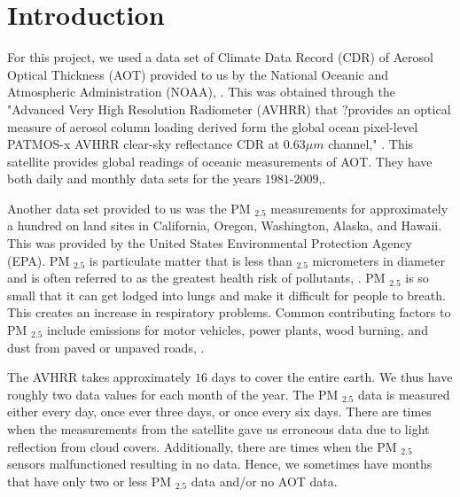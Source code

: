 \documentclass[10pt]{article}
\begin{document}
\section{Introduction}
	For this project, we used a data set of Climate Data Record (CDR) of Aerosol Optical Thickness (AOT) provided to us by the National Oceanic and Atmospheric Administration (NOAA), \cite{noaa}. This was obtained through the "Advanced Very High Resolution Radiometer (AVHRR) that ?provides an optical measure of aerosol column loading derived form the global ocean pixel-level PATMOS-x AVHRR clear-sky reflectance CDR at $0.63\mu m$ channel," \cite{noaa}. This satellite provides global readings of oceanic measurements of AOT. They have both daily and monthly data sets for the years $1981$-$2009$,\cite{noaa}. 

Another data set provided to us was the PM $_{2.5}$ measurements for approximately a hundred on land sites in California, Oregon, Washington, Alaska, and Hawaii. This was provided by the United States Environmental Protection Agency (EPA). PM $_{2.5}$ is particulate matter that is less than $_{2.5}$ micrometers in diameter and is often referred to as the greatest health risk of pollutants, \cite{epa}.  PM $_{2.5}$ is so small that it can get lodged into lungs and make it difficult for people to breath. This creates an increase in respiratory problems. Common contributing factors to PM $_{2.5}$ include emissions for motor vehicles, power plants, wood burning, and dust from paved or unpaved roads, \cite{epa}. 

The AVHRR takes approximately $16$ days to cover the entire earth. We thus have roughly two data values for each month of the year. The PM $_{2.5}$ data is measured either every day, once ever three days, or once every six days. There are times when the measurements from the satellite gave us erroneous data due to light reflection from cloud covers. Additionally, there are times when the PM $_{2.5}$ sensors malfunctioned resulting in no data. Hence, we sometimes have months that have only two or less PM $_{2.5}$ data and/or no AOT data. 
\end{document}
